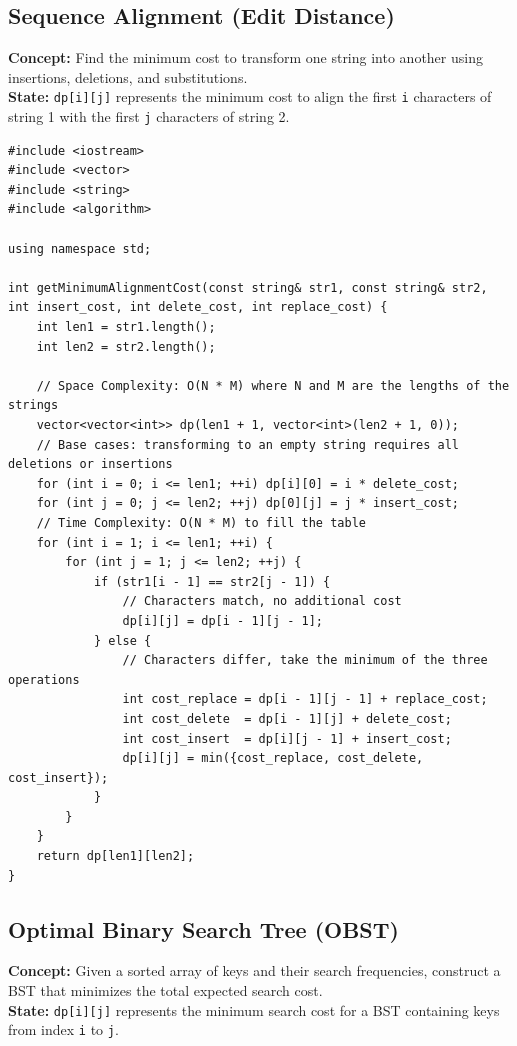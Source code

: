 \subsection{Sequence Alignment (Edit Distance)}
\textbf{Concept:} Find the minimum cost to transform one string into another using insertions, deletions, and substitutions.
\\
\textbf{State:} \texttt{dp[i][j]} represents the minimum cost to align the first \texttt{i} characters of string 1 with the first \texttt{j} characters of string 2.

\begin{lstlisting}
#include <iostream>
#include <vector>
#include <string>
#include <algorithm>

using namespace std;

int getMinimumAlignmentCost(const string& str1, const string& str2, int insert_cost, int delete_cost, int replace_cost) {
    int len1 = str1.length();
    int len2 = str2.length();
    
    // Space Complexity: O(N * M) where N and M are the lengths of the strings
    vector<vector<int>> dp(len1 + 1, vector<int>(len2 + 1, 0));
    // Base cases: transforming to an empty string requires all deletions or insertions
    for (int i = 0; i <= len1; ++i) dp[i][0] = i * delete_cost;
    for (int j = 0; j <= len2; ++j) dp[0][j] = j * insert_cost;
    // Time Complexity: O(N * M) to fill the table
    for (int i = 1; i <= len1; ++i) {
        for (int j = 1; j <= len2; ++j) {
            if (str1[i - 1] == str2[j - 1]) {
                // Characters match, no additional cost
                dp[i][j] = dp[i - 1][j - 1];
            } else {
                // Characters differ, take the minimum of the three operations
                int cost_replace = dp[i - 1][j - 1] + replace_cost;
                int cost_delete  = dp[i - 1][j] + delete_cost;
                int cost_insert  = dp[i][j - 1] + insert_cost;
                dp[i][j] = min({cost_replace, cost_delete, cost_insert});
            }
        }
    }
    return dp[len1][len2];
}
\end{lstlisting}

\subsection{Optimal Binary Search Tree (OBST)}
\textbf{Concept:} Given a sorted array of keys and their search frequencies, construct a BST that minimizes the total expected search cost.
\\
\textbf{State:} \texttt{dp[i][j]} represents the minimum search cost for a BST containing keys from index \texttt{i} to \texttt{j}.

